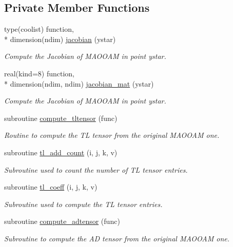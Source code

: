 \subsection*{Private Member Functions}
\begin{DoxyCompactItemize}
\item 
type(coolist) function, \\*
dimension(ndim) \hyperlink{classmaooam__tl__ad_a2b780ea6ad36ecf3d3f2941105a707f7}{jacobian} (ystar)
\begin{DoxyCompactList}\small\item\em Compute the Jacobian of M\-A\-O\-O\-A\-M in point ystar. \end{DoxyCompactList}\item 
real(kind=8) function, \\*
dimension(ndim, ndim) \hyperlink{classmaooam__tl__ad_ad859ca2ff53ab788f26a13395a3f9e7f}{jacobian\-\_\-mat} (ystar)
\begin{DoxyCompactList}\small\item\em Compute the Jacobian of M\-A\-O\-O\-A\-M in point ystar. \end{DoxyCompactList}\item 
subroutine \hyperlink{classmaooam__tl__ad_aafe6576927ac76c7cd1f88bd68440ddf}{compute\-\_\-tltensor} (func)
\begin{DoxyCompactList}\small\item\em Routine to compute the T\-L tensor from the original M\-A\-O\-O\-A\-M one. \end{DoxyCompactList}\item 
subroutine \hyperlink{classmaooam__tl__ad_a989ca71183684f62e6ee189460b452ed}{tl\-\_\-add\-\_\-count} (i, j, k, v)
\begin{DoxyCompactList}\small\item\em Subroutine used to count the number of T\-L tensor entries. \end{DoxyCompactList}\item 
subroutine \hyperlink{classmaooam__tl__ad_a55a808939f42b2ea438c2621cbb60345}{tl\-\_\-coeff} (i, j, k, v)
\begin{DoxyCompactList}\small\item\em Subroutine used to compute the T\-L tensor entries. \end{DoxyCompactList}\item 
subroutine \hyperlink{classmaooam__tl__ad_a7180afb1052d2d5f0401003c731eb5c3}{compute\-\_\-adtensor} (func)
\begin{DoxyCompactList}\small\item\em Subroutine to compute the A\-D tensor from the original M\-A\-O\-O\-A\-M one. \end{DoxyCompactList}\item 

\end{DoxyCompactItemize}

